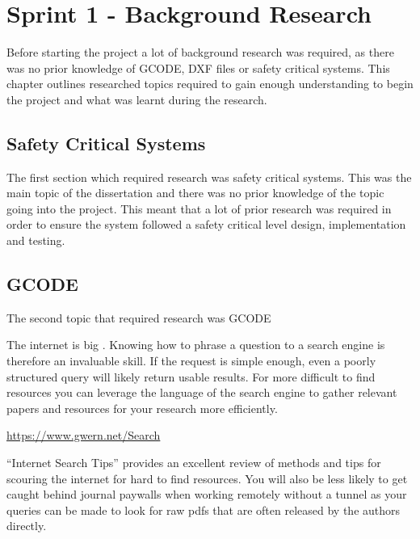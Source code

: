 \chapter{Sprint 1 - Background Research}
	\label{chap:background}
		
	Before starting the project a lot of background research was required, as there was no prior knowledge of GCODE, DXF files or safety critical systems. This chapter outlines researched topics required to gain enough understanding to begin the project and what was learnt during the research.

	\section{Safety Critical Systems}
		The first section which required research was safety critical systems. This was the main topic of the dissertation and there was no prior knowledge of the topic going into the project. This meant that a lot of prior research was required in order to ensure the system followed a safety critical level design, implementation and testing.
		
		
	\section{GCODE}
		\label{sec:gcode}

		The second topic that required research was GCODE

		The internet is big \cite{sizeofinternet}. Knowing how to phrase a question to a search engine is therefore an invaluable skill. If the request is simple enough, even a poorly structured query will likely return usable results. For more difficult to find resources you can leverage the language of the search engine to gather relevant papers and resources for your research more efficiently. 
		
		\begin{center}
		{\small \url{https://www.gwern.net/Search}}
		\end{center}
		
		``Internet Search Tips'' \cite{gwern} provides an excellent review of methods and tips for scouring the internet for hard to find resources. You will also be less likely to get caught behind journal paywalls when working remotely without a tunnel as your queries can be made to look for raw pdfs that are often released by the authors directly.
			
